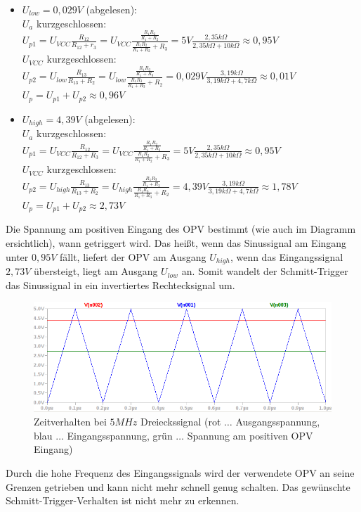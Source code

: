 \documentclass[12pt,a4paper,titlepage]{article}
\begin{document}
\begin{itemize}
  \item $U_{low} = 0,029V$ (abgelesen):\\
  $U_a$ kurzgeschlossen:\\
  $U_{p1} = U_{VCC}\frac{R_{12}}{R_{12}+r_3} = U_{VCC}\frac{\frac{R_1R_2}{R_1+R_2}}{\frac{R_1R_2}{R_1+R_2}+R_3} = 5V\frac{2,35k\Omega}{2,35k\Omega + 10k\Omega} \approx 0,95V$\\
  $U_{VCC}$ kurzgeschlossen:\\
  $U_{p2} = U_{low}\frac{R_{13}}{R_{13}+R_2} = U_{low}\frac{\frac{R_1R_3}{R_1+R_3}}{\frac{R_1R_3}{R_1+R_3}+R_2} = 0,029V\frac{3,19k\Omega}{3,19k\Omega + 4,7k\Omega} \approx 0,01V$\\
  $U_p = U_{p1} + U_{p2} \approx 0,96V$

  \item $U_{high} = 4,39V$ (abgelesen):\\
  $U_a$ kurzgeschlossen:\\
  $U_{p1} = U_{VCC}\frac{R_{12}}{R_{12}+R_3} = U_{VCC}\frac{\frac{R_1R_2}{R_1+R_2}}{\frac{R_1R_2}{R_1+R_2}+R_3} = 5V\frac{2,35k\Omega}{2,35k\Omega + 10k\Omega} \approx 0,95V$\\
  $U_{VCC}$ kurzgeschlossen:\\
  $U_{p2} = U_{high}\frac{R_{13}}{R_{13}+R_2} = U_{high}\frac{\frac{R_1R_3}{R_1+R_3}}{\frac{R_1R_3}{R_1+R_3}+R_2} = 4,39V\frac{3,19k\Omega}{3,19k\Omega + 4,7k\Omega} \approx 1,78V$\\
  $U_p = U_{p1} + U_{p2} \approx 2,73V$
\end{itemize}

\noindent Die Spannung am positiven Eingang des OPV bestimmt (wie auch im Diagramm ersichtlich), wann getriggert wird. Das heißt, wenn das Sinussignal am Eingang unter $0,95V$ f\"allt, liefert der OPV am Ausgang $U_{high}$, wenn das Eingangssignal $2,73V$ \"ubersteigt, liegt am Ausgang $U_{low}$ an. Somit wandelt der Schmitt-Trigger das Sinussignal in ein invertiertes Rechtecksignal um.

\begin{figure}[H]
  \centering
  \includegraphics[width=150mm]{schmitt_transient2.png}
  \caption{Zeitverhalten bei $5MHz$ Dreieckssignal (rot $\hdots$ Ausgangsspannung, blau $\hdots$ Eingangsspannung, gr\"un $\hdots$ Spannung am positiven OPV Eingang)}
\end{figure}

\noindent Durch die hohe Frequenz des Eingangssignals wird der verwendete OPV an seine Grenzen getrieben und kann nicht mehr schnell genug schalten. Das gew\"unschte Schmitt-Trigger-Verhalten ist nicht mehr zu erkennen.
\end{document}

